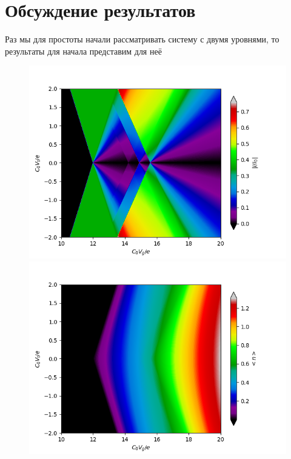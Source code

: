 \documentclass[12pt,a4paper]{report}
\begin{document}
\section*{Обсуждение результатов}
Раз мы для простоты начали рассматривать систему с двумя уровнями, то результаты для начала представим для неё
\begin{figure}[h!]
\begin{floatrow}
           {\includegraphics[scale = 0.6]{current 2lvl}}
           {\includegraphics[scale = 0.6]{n 2lvl}}  
\end{floatrow}    
\end{figure}
\end{document}
